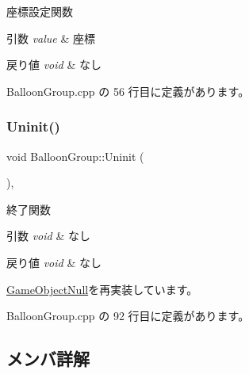座標設定関数 


\begin{DoxyParams}{引数}
{\em value} & 座標 \\
\hline
\end{DoxyParams}

\begin{DoxyRetVals}{戻り値}
{\em void} & なし \\
\hline
\end{DoxyRetVals}


 Balloon\+Group.\+cpp の 56 行目に定義があります。

\mbox{\label{class_balloon_group_a12ade72ec1cbb2a1afe431c471bbc255}} 
\subsubsection{\texorpdfstring{Uninit()}{Uninit()}}
{\footnotesize\ttfamily void Balloon\+Group\+::\+Uninit (\begin{DoxyParamCaption}{ }\end{DoxyParamCaption})\hspace{0.3cm}{\ttfamily [override]}, {\ttfamily [virtual]}}



終了関数 


\begin{DoxyParams}{引数}
{\em void} & なし \\
\hline
\end{DoxyParams}

\begin{DoxyRetVals}{戻り値}
{\em void} & なし \\
\hline
\end{DoxyRetVals}


\mbox{\hyperlink{class_game_object_null_a1a70fbd3260fd1c0100320756830a0db}{Game\+Object\+Null}}を再実装しています。



 Balloon\+Group.\+cpp の 92 行目に定義があります。



\subsection{メンバ詳解}
\mbox{\label{class_balloon_group_a1ff5315ab1a2d7706399cdd8db1f1a70}} 
